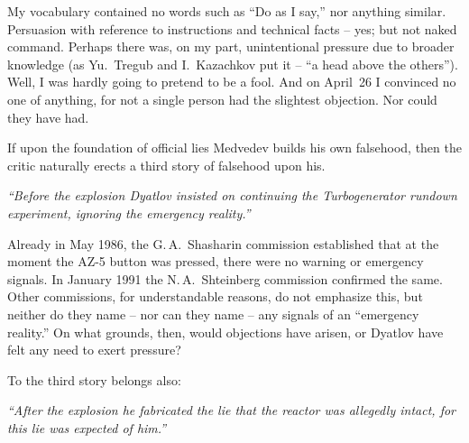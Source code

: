\documentclass[openright]{bookest}
\begin{document}

My vocabulary contained no words such as ``Do as I say,'' nor anything similar. Persuasion with reference to instructions and technical facts -- yes; but not naked command. Perhaps there was, on my part, unintentional pressure due to broader knowledge (as Yu.~Tregub and I.~Kazachkov put it -- ``a head above the others''). Well, I was hardly going to pretend to be a fool. And on April~26 I convinced no one of anything, for not a single person had the slightest objection. Nor could they have had.

If upon the foundation of official lies Medvedev builds his own falsehood, then the critic naturally erects a third story of falsehood upon his.

\begin{personal}
\textit{``Before the explosion Dyatlov insisted on continuing the Turbogenerator rundown experiment, ignoring the emergency reality.''}
\end{personal}

Already in May 1986, the G.\,A.~Shasharin commission established that at the moment the AZ-5 button was pressed, there were no warning or emergency signals. In January 1991 the N.\,A.~Shteinberg commission confirmed the same. Other commissions, for understandable reasons, do not emphasize this, but neither do they name -- nor can they name -- any signals of an ``emergency reality.'' On what grounds, then, would objections have arisen, or Dyatlov have felt any need to exert pressure?

To the third story belongs also:

\begin{personal}
\textit{``After the explosion he fabricated the lie that the reactor was allegedly intact, for this lie was expected of him.''}
\end{personal}
\end{document}
